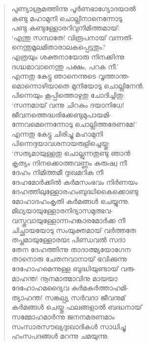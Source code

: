\begin{verse}
പുണ്യാശ്രമത്തിന്നു പൂര്‍ണഭാഗ്യോദയാല്‍\\
കണ്ടു മഹാമുനി ചൊല്ലിനാനെന്നോടു\\
പണ്ടു കണ്ടുള്ളോരറിവുനിമിത്തമായ്:\\
‘എന്തു സമ്പാതേ! വിരൂപനായ് വന്നതി-\\
നെന്തുമൂലമിതാരാലകപ്പെട്ടതും?\\
എത്രയും ശക്തനായോരു നിനക്കിന്നു\\
ദഗ്ദ്ധമാവാനെന്തു പക്ഷം, പറക നീ.’\\
എന്നതു കേട്ടു ഞാനെന്നുടെ വൃത്താന്ത-\\
മൊന്നൊഴിയാതെ മുനിയോടു ചൊല്ലിനേന്‍.\\
പിന്നെയും കൂപ്പിത്തൊഴുതു ചോദിച്ചിതു:\\
‘സന്നമായ് വന്നു ചിറകും ദയാനിധേ!\\
ജീവനത്തെദ്ധരിക്കേണ്ടുമുപായമി-\\
ന്നേവമെന്നെന്നോടു ചൊല്ലിത്തരേണമേ!’\\
എന്നതു കേട്ടു ചിരിച്ചു മഹാമുനി\\
പിന്നെദ്ദയാവശനായരുളിച്ചെയ്തു:\\
‘സത്യമായുള്ളതു ചൊല്ലുന്നതുണ്ടു ഞാന്‍\\
കൃത്യം നിനക്കൊത്തവണ്ണം കുരുഷ്വ നീ\\
ദേഹം നിമിത്തമീ ദുഃഖമറിക നീ\\
ദേഹമോര്‍ക്കില്‍ കര്‍മസംഭവം നിര്‍ണയം\\
ദേഹത്തിലുള്ളോരഹംബുദ്ധികൈക്കൊണ്ടു\\
മോഹാദഹംകൃതി കര്‍മങ്ങള്‍ ചെയ്യുന്നു.\\
മിഥ്യയായുള്ളോരനിദ്യാസമുത്ഭവ-\\
വസ്തുവായുള്ളോന്നഹങ്കാരമോര്‍ക്ക നീ\\
ചിച്ഛായയോടു സംയുക്തമായ് വര്‍ത്തതേ\\
തപ്തമായുള്ളോരയഃ പിണ്ഡവല്‍ സദാ\\
തേന ദേഹത്തിന്നു താദാത്മ്യയോഗേന\\
താനൊരു ചേതനവാനായ് ഭവിക്കുന്നു\\
ദേഹോഹമെന്നുള്ള ബുദ്ധിയുണ്ടായ് വരു-\\
മാഹന്ത! നൂനമാത്മാവിനു മായയാ\\
ദേഹോഹമദ്യൈവ കര്‍മകര്‍ത്താഹമി-\\
ത്യാഹന്ത! സങ്കല്പ്യ സര്‍വദാ ജീവനുമ്\\
കര്‍മങ്ങള്‍ ചെയ്തു ഫലങ്ങളാല്‍ ബദ്ധനായ്\\
സമ്മോഹമാര്‍ന്നു ജനനമരണമാം\\
സംസാരസൗഖ്യദുഃഖാദികള്‍ സാധിച്ചു\\
ഹംസപദങ്ങള്‍ മറന്നു ചമയുന്നു.\\

\end{verse}
